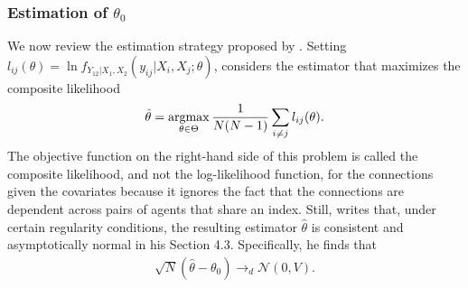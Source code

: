 \documentclass[12pt]{article}
\theoremstyle{definition}
\newcommand{\argmax}{\operatornamewithlimits{argmax}}
\begin{document}
\subsubsection{Estimation of $\theta_0$}
We now review the estimation strategy proposed by \cite{graham2020network}. Setting  $l_{ij}(\theta) = \ln f_{Y_{12}|X_1,X_2}(y_{ij}|X_i,X_j;\theta)$, \cite{graham2020network} considers the estimator that maximizes the composite likelihood 
\begin{align*}
\hat{\theta} = \argmax_{\theta \in \Theta}\frac{1}{N(N-1)}\sum_{i \neq j}l_{ij}(\theta).
\end{align*}
The objective function on the right-hand side of this problem is called the composite likelihood, and not the log-likelihood function, for the connections given the covariates because it ignores the fact that the connections are dependent across pairs of agents that share an index. Still, \cite{graham2020network} writes that, under certain regularity conditions, the resulting estimator $\hat{\theta}$ is consistent and asymptotically normal in his Section 4.3. Specifically, he finds that 
  \begin{align*}
 \sqrt{N}(\hat{\theta}-\theta_0) \to_d \mathcal{N}\left(0,V\right).
 \end{align*}
\end{document}
